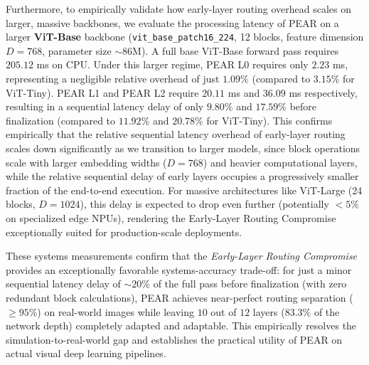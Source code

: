 Furthermore, to empirically validate how early-layer routing overhead scales on larger, massive backbones, we evaluate the processing latency of PEAR on a larger \textbf{ViT-Base} backbone (\texttt{vit\_base\_patch16\_224}, 12 blocks, feature dimension $D=768$, parameter size $\sim 86$M). A full base ViT-Base forward pass requires $205.12$ ms on CPU. Under this larger regime, PEAR L0 requires only $2.23$ ms, representing a negligible relative overhead of just $\mathbf{1.09\%}$ (compared to $3.15\%$ for ViT-Tiny). PEAR L1 and PEAR L2 require $20.11$ ms and $36.09$ ms respectively, resulting in a sequential latency delay of only $\mathbf{9.80\%}$ and $\mathbf{17.59\%}$ before finalization (compared to $11.92\%$ and $20.78\%$ for ViT-Tiny). This confirms empirically that the relative sequential latency overhead of early-layer routing scales down significantly as we transition to larger models, since block operations scale with larger embedding widths ($D=768$) and heavier computational layers, while the relative sequential delay of early layers occupies a progressively smaller fraction of the end-to-end execution. For massive architectures like ViT-Large (24 blocks, $D=1024$), this delay is expected to drop even further (potentially $<5\%$ on specialized edge NPUs), rendering the Early-Layer Routing Compromise exceptionally suited for production-scale deployments.

These systems measurements confirm that the \emph{Early-Layer Routing Compromise} provides an exceptionally favorable systems-accuracy trade-off: for just a minor sequential latency delay of $\sim 20\%$ of the full pass before finalization (with zero redundant block calculations), PEAR achieves near-perfect routing separation ($\ge 95\%$) on real-world images while leaving $10$ out of $12$ layers ($83.3\%$ of the network depth) completely adapted and adaptable. This empirically resolves the simulation-to-real-world gap and establishes the practical utility of PEAR on actual visual deep learning pipelines.
